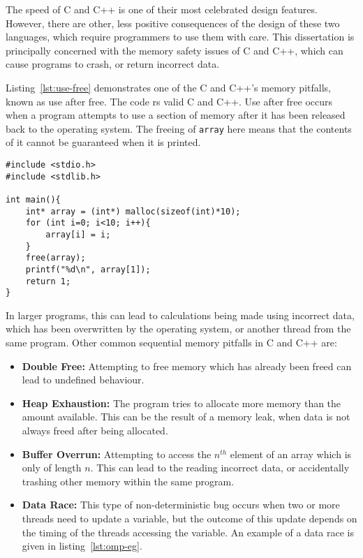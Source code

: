The speed of C and C++ is one of their most celebrated design features. However, there are other, less positive consequences of the design of these two languages, which require programmers to use them with care. This dissertation is principally concerned with the memory safety issues of C and C++, which can cause programs to crash, or return incorrect data.

Listing~\ref{lst:use-free} demonstrates one of the C and C++'s memory pitfalls, known as use after free. The code rs valid C and C++. Use after free occurs when a program attempts to use a section of memory after it has been released back to the operating system.
The freeing of \texttt{array} here means that the contents of it cannot be guaranteed when it is printed.

\begin{code}
\begin{verbatim}
#include <stdio.h>
#include <stdlib.h>

int main(){
    int* array = (int*) malloc(sizeof(int)*10);
    for (int i=0; i<10; i++){
        array[i] = i;
    }
    free(array);
    printf("%d\n", array[1]);
    return 1;
}
\end{verbatim}
\label{lst:use-free}
\end{code}

In larger programs, this can lead to calculations being made using incorrect data, which has been overwritten by the operating system, or another thread from the same program. Other common sequential memory pitfalls in C and C++ are:

\begin{itemize}
    \item \textbf{Double Free:} Attempting to free memory which has already been freed can lead to undefined behaviour.
    \item \textbf{Heap Exhaustion:} The program tries to allocate more memory than the amount available. This can be the result of a memory leak, when data is not always freed after being allocated.
    \item \textbf{Buffer Overrun:} Attempting to access the $n^{th}$ element of an array which is only of length $n$. This can lead to the reading incorrect data, or accidentally trashing other memory within the same program.
    \item \textbf{Data Race:} This type of non-deterministic bug occurs when two or more threads need to update a variable, but the outcome of this update depends on the timing of the threads accessing the variable. An example of a data race is given in listing~\ref{lst:omp-eg}.
\end{itemize}

